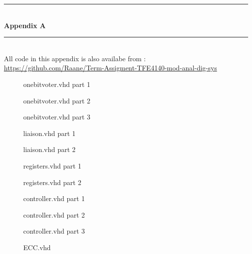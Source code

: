 \documentclass[a4paper]{IEEEtran}
\begin{document}
\begin{titlepage}
    \newcommand{\HRule}{\rule{\linewidth}{0.5mm}} %
    \center %
    \vspace*{3cm}
    \HRule \\[0.4cm]
    { \huge \bfseries Appendix A}\\[0.4cm] %
    \HRule \\[1.5cm]
    All code in this appendix is also availabe from : \break \href{https://github.com/Raane/Term-Assigment-TFE4140-mod-anal-dig-sys}{https://github.com/Raane/Term-Assigment-TFE4140-mod-anal-dig-sys}

\begin{figure}[h!]
    
\caption{onebitvoter.vhd part 1}
\end{figure}
\begin{figure}[h!]
    
\caption{onebitvoter.vhd part 2}
\end{figure}
\begin{figure}[h!]
    
\caption{onebitvoter.vhd part 3}
\end{figure}
\begin{figure}[h!]
    
\caption{liaison.vhd part 1}
\end{figure}
\begin{figure}[h!]
    
\caption{liaison.vhd part 2}
\end{figure}
\begin{figure}[h!]
    
\caption{registers.vhd part 1}
\end{figure}
\begin{figure}[h!]
    
\caption{registers.vhd part 2}
\end{figure}
\begin{figure}[h!]
    
\caption{controller.vhd part 1}
\end{figure}
\begin{figure}[h!]
    
\caption{controller.vhd part 2}
\end{figure}
\begin{figure}[h!]
    
\caption{controller.vhd part 3}
\end{figure}
\begin{figure}[h!]
    
\caption{ECC.vhd}
\end{figure}

\end{titlepage}
\end{document}
